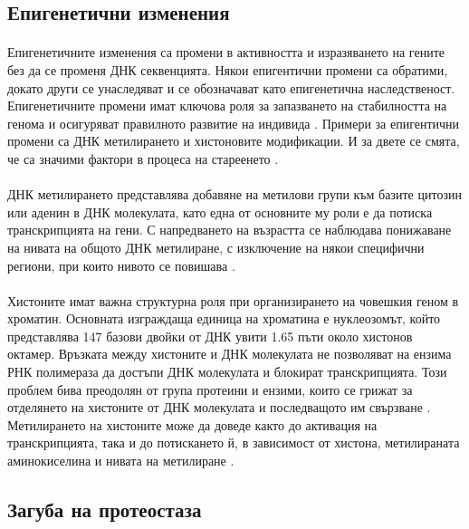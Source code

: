 \documentclass[pdftex,cyrillic,14pt,a4page,twoside,openright]{extreport}
\begin{document}
\subsection{Епигенетични изменения}
\paragraph{}
Епигенетичните изменения са промени в активността и изразяването на гените без да се променя ДНК секвенцията. Някои епигентични промени са обратими, докато други се унаследяват и се обозначават като епигенетична наследственост. Епигенетичните промени имат ключова роля за запазването на стабилността на генома и осигуряват правилното развитие на индивида \cite{dupont2009}. Примери за епигентични промени са ДНК метилирането и хистоновите модификации. И за двете се смята, че са значими фактори в процеса на стареенето \cite{daquila2013, aitbaev2019}.

\paragraph{}
ДНК метилирането представлява добавяне на метилови групи към базите цитозин или аденин в ДНК молекулата, като една от основните му роли е да потиска транскрипцията на гени. С напредването на възрастта се наблюдава понижаване на нивата на общото ДНК метилиране, с изключение на някои специфични региони, при които нивото се повишава \cite{jung2015}.

\paragraph{}
Хистоните имат важна структурна роля при организирането на човешкия геном в хроматин. Основната изграждаща единица на хроматина е нуклеозомът, който представлява 147 базови двойки от ДНК увити 1.65 пъти около хистонов октамер. Връзката между хистоните и ДНК молекулата не позволяват на ензима РНК полимераза да достъпи ДНК молекулата и блокират транскрипцията. Този проблем бива преодолян от група протеини и ензими, които се грижат за отделянето на хистоните от ДНК молекулата и последващото им свързване \cite{das2012}. Метилирането на хистоните може да доведе както до активация на транскрипцията, така и до потискането й, в зависимост от хистона, метилираната аминокиселина и нивата на метилиране \cite{yi2020}.

\subsection{Загуба на протеостаза}
\end{document}
